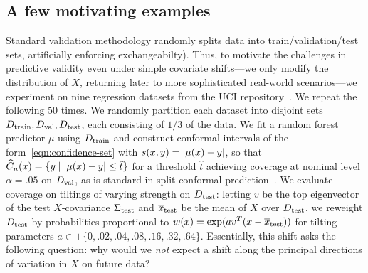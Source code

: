 

\subsection{A few motivating examples}
\label{sec:motivation-exp}


Standard validation methodology randomly splits data into
train/validation/test sets, artificially enforcing exchangeabilty).  Thus,
to motivate the challenges in predictive validity even
under simple covariate shifts---we only modify the
distribution of $X$, returning later to more sophisticated real-world
scenarios---we experiment on nine regression datasets from the UCI
repository~\cite{DuaGr17}. We repeat the following 50 times.  We randomly
partition each dataset into disjoint sets $D_{\textrm{train}}, D_{\textrm{val}}, D_{\textrm{test}}$,
each consisting of $1/3$ of the data. We fit a random forest predictor $\mu$
using $D_{\textrm{train}}$ and construct conformal intervals of the
form~\eqref{eqn:confidence-set} with $s(x, y) = |\mu(x)- y|$, so that
$\widehat{C}_n(x) = \{y \mid |\mu(x) - y| \le \hat{t}\}$ for a threshold
$\hat{t}$ achieving coverage at nominal level $\alpha = .05$ on $D_{\textrm{val}}$, as
is standard in split-conformal prediction~\cite{VovkGaSh05}.
We evaluate coverage on tiltings of varying strength on $D_{\textrm{test}}$: letting
$v$ be the top eigenvector of the test $X$-covariance $\Sigma_{\textrm{test}}$
and $\overline{x}_{\textrm{test}}$ be the mean of $X$ over $D_{\textrm{test}}$, we reweight $D_{\textrm{test}}$
by probabilities proportional to $w(x) = \exp(a v^T (x -
\overline{x}_{\textrm{test}}))$ for tilting parameters $a \in \pm \{0, .02, .04, .08, .16,
.32, .64\}$. Essentially, this shift asks the following question: why
would we \emph{not} expect a shift along the principal directions of
variation in $X$ on future data?

